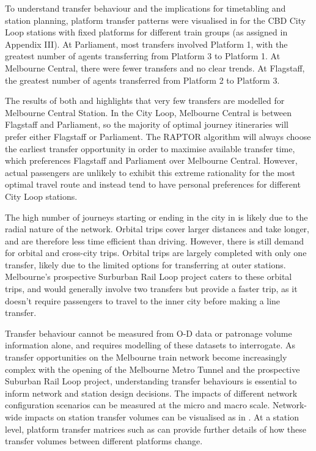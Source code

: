 \pagebreak{}
To understand transfer behaviour and the implications for timetabling and station planning, platform transfer patterns were visualised in  for the CBD City Loop stations with fixed platforms for different train groups (as assigned in Appendix III). At Parliament, most transfers involved Platform 1, with the greatest number of agents transferring from Platform 3 to Platform 1. At Melbourne Central, there were fewer transfers and no clear trends. At Flagstaff, the greatest number of agents transferred from Platform 2 to Platform 3. 

The results of both  and  highlights that very few transfers are modelled for Melbourne Central Station. In the City Loop, Melbourne Central is between Flagstaff and Parliament, so the majority of optimal journey itineraries will prefer either Flagstaff or Parliament. The RAPTOR algorithm will always choose the earliest transfer opportunity in order to maximise available transfer time, which preferences Flagstaff and Parliament over Melbourne Central. However, actual passengers are unlikely to exhibit this extreme rationality for the most optimal travel route and instead tend to have personal preferences for different City Loop stations. %

The high number of journeys starting or ending in the city in  is likely due to the radial nature of the network. Orbital trips cover larger distances and take longer, and are therefore less time efficient than driving. However, there is still demand for orbital and cross-city trips. Orbital trips are largely completed with only one transfer, likely due to the limited options for transferring at outer stations. Melbourne's prospective Surburban Rail Loop project caters to these orbital trips, and would generally involve two transfers but provide a faster trip, as it doesn't require passengers to travel to the inner city before making a line transfer. 

Transfer behaviour cannot be measured from O-D data or patronage volume information alone, and requires modelling of these datasets to interrogate. As transfer opportunities on the Melbourne train network become increasingly complex with the opening of the Melbourne Metro Tunnel and the prospective Suburban Rail Loop project, understanding transfer behaviours is essential to inform network and station design decisions. The impacts of different network configuration scenarios can be measured at the micro and macro scale. Network-wide impacts on station transfer volumes can be visualised as in . At a station level, platform transfer matrices such as  can provide further details of how these transfer volumes between different platforms change. 

